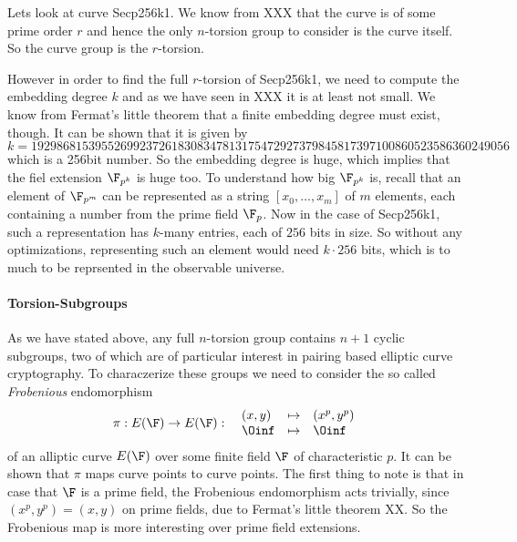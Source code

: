 \begin{example} 
Lets look at curve Secp256k1. We know from XXX that the curve is of some prime order $r$ and hence the only $n$-torsion group to consider is the curve itself. So the curve group is the $r$-torsion. 

However in order to find the full $r$-torsion of Secp256k1, we need to compute the embedding degree $k$ and as we have seen in XXX it is at least not small. We know from Fermat's little theorem that a finite embedding degree must exist, though. It can be shown that it is given by
$$
k = \scriptstyle 192986815395526992372618308347813175472927379845817397100860523586360249056 
$$
which is a 256bit number. So the embedding degree is huge, which implies that the fiel extension $\F_{p^k}$ is huge too. To understand how big $\F_{p^k}$ is, recall that an element of $\F_{p^m}$ can be represented as a string $[x_0,\ldots,x_m]$ of $m$ elements, each containing a number from the prime field $\F_p$. Now in the case of Secp256k1, such a representation has $k$-many entries, each of $256$ bits in size. So without any optimizations, representing such an element would need $k\cdot 256$ bits, which is to much to be reprsented in the observable universe.
\end{example}
\paragraph{Torsion-Subgroups}As we have stated above, any full $n$-torsion group contains $n+1$ cyclic subgroups, two of which are of particular interest in pairing based elliptic curve cryptography. To characzerize these groups we need to consider the so called \textit{Frobenious} endomorphism
\begin{equation}
\pi : E(\F) \to E(\F): \;\; 
\begin{array}{lcl}
(x,y)       &\mapsto & (x^p,y^p)\\
\Oinf &\mapsto & \Oinf
\end{array} 
\end{equation}
of an alliptic curve $E(\F)$ over some finite field $\F$ of characteristic $p$. It can be shown that $\pi$ maps curve points to curve points. The first thing to note is that in case that $\F$ is a prime field, the Frobenious endomorphism acts trivially, since $(x^p,y^p) = (x,y)$ on prime fields, due to Fermat's little theorem XX. So the Frobenious map is more interesting over prime field extensions.

